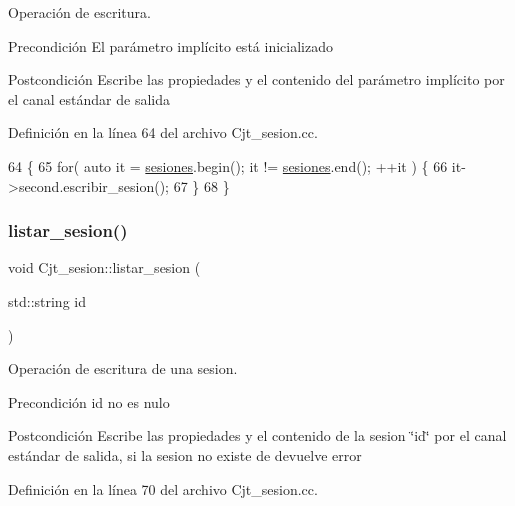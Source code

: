 Operación de escritura. 

\begin{DoxyPrecond}{Precondición}
El parámetro implícito está inicializado 
\end{DoxyPrecond}
\begin{DoxyPostcond}{Postcondición}
Escribe las propiedades y el contenido del parámetro implícito por el canal estándar de salida 
\end{DoxyPostcond}


Definición en la línea 64 del archivo Cjt\+\_\+sesion.\+cc.


\begin{DoxyCode}
64                                  \{
65   \textcolor{keywordflow}{for}( \textcolor{keyword}{auto} it = \mbox{\hyperlink{class_cjt__sesion_abac1c2ee3cccc598a8274c7da869aa9b}{sesiones}}.begin(); it != \mbox{\hyperlink{class_cjt__sesion_abac1c2ee3cccc598a8274c7da869aa9b}{sesiones}}.end(); ++it ) \{
66     it->second.escribir\_sesion();
67   \}
68 \}
\end{DoxyCode}
\mbox{\label{class_cjt__sesion_a8d8d2ba30c0efeb90e21a9b41fa2c62e}} 
\subsubsection{\texorpdfstring{listar\+\_\+sesion()}{listar\_sesion()}}
{\footnotesize\ttfamily void Cjt\+\_\+sesion\+::listar\+\_\+sesion (\begin{DoxyParamCaption}\item[{std\+::string}]{id }\end{DoxyParamCaption})}



Operación de escritura de una sesion. 

\begin{DoxyPrecond}{Precondición}
id no es nulo 
\end{DoxyPrecond}
\begin{DoxyPostcond}{Postcondición}
Escribe las propiedades y el contenido de la sesion \char`\"{}id\char`\"{} por el canal estándar de salida, si la sesion no existe de devuelve error 
\end{DoxyPostcond}


Definición en la línea 70 del archivo Cjt\+\_\+sesion.\+cc.


